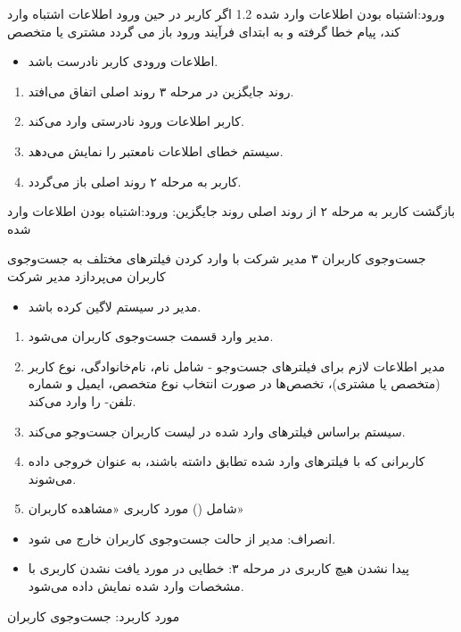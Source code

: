 \alternativeflow
{
	ورود:اشتباه بودن اطلاعات وارد شده
}
{1.2}
{
	اگر کاربر در حین ورود اطلاعات اشتباه وارد کند، پیام خطا گرفته و به ابتدای فرآیند ورود باز می گردد
}
{
	مشتری یا متخصص
}
{}
{
	\begin{itemize}
		
		\item
		اطلاعات ورودی کاربر نادرست باشد.
	\end{itemize}
}
{
	\vspace*{-0.6cm}
	\begin{enumerate}
		\item 
		روند جایگزین در مرحله ۳ روند اصلی اتفاق می‌افتد.
		\item
		کاربر اطلاعات ورود نادرستی وارد می‌کند.
		\item 
		سیستم خطای اطلاعات نامعتبر را نمایش می‌دهد.
		\item
		کاربر به مرحله ۲ روند اصلی باز می‌گردد.
	\end{enumerate}
}
{
	بازگشت کاربر به مرحله ۲ از روند اصلی
}
{
	روند جایگزین: ورود:اشتباه بودن اطلاعات وارد شده
}


\usecase
{جست‌وجوی کاربران}
{۳}
{مدیر شرکت با وارد کردن فیلترهای مختلف به جست‌و‌جوی کاربران می‌پردازد}
{مدیر شرکت}
{}
{
	\begin{itemize}
	\item
	مدیر در سیستم لاگین کرده باشد.
	
	\end{itemize}
 }
{
\begin{enumerate}
	\item 
	مدیر وارد قسمت جست‌وجوی کاربران می‌شود.
	
	\item 
	مدیر اطلاعات لازم برای فیلتر‌های جست‌وجو - شامل نام،‌ نام‌خانوادگی، نوع کاربر (متخصص یا مشتری)، تخصص‌ها در صورت انتخاب نوع متخصص، ایمیل و شماره تلفن- را وارد می‌کند.
	
	\item
	سیستم براساس فیلتر‌های وارد شده در لیست کاربران جست‌وجو می‌کند.
	
	\item 
	کاربرانی که با فیلتر‌های وارد شده تطابق داشته باشند، به عنوان خروجی داده می‌شوند.
	
	\item
	شامل () مورد کاربری «مشاهده کاربران»
\end{enumerate}
}
{}
{
\begin{itemize}
	\item	
	انصراف: مدیر از حالت جست‌وجوی کاربران خارج می شود.
	
	\item 
	پیدا نشدن هیچ کاربری در مرحله ۳: خطایی در مورد یافت نشدن کاربری با مشخصات وارد شده نمایش داده می‌شود.
\end{itemize}
}
{مورد کاربرد: جست‌وجوی کاربران}


